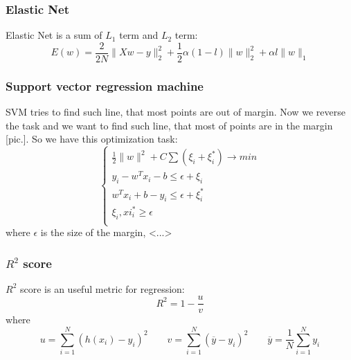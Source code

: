 \subsubsection*{Elastic Net}

Elastic Net is a sum of $L_1$ term and $L_2$ term:
$$E(w)=\frac{2}{2N}\|Xw-y\|_2^2+\frac{1}{2}\alpha(1-l)\|w\|_2^2+\alpha l\|w\|_1$$

\subsubsection*{Support vector regression machine}

SVM tries to find such line, that most points are out of margin. Now we reverse the task and we want to find such line, that most of points are in the margin [pic.]. So we have this optimization task:
$$\begin{cases}
	\frac{1}{2}\|w\|^2+C\sum(\xi_i+\xi_i^*)\to min \\
	y_i-w^Tx_i-b\le\epsilon+\xi_i \\
	w^Tx_i+b-y_i\le\epsilon+\xi_i^* \\
	\xi_i,xi_i^* \ge \epsilon \\
\end{cases}$$
where $\epsilon$ is the size of the margin, <...>

\subsubsection*{$R^2$ score}

$R^2$ score is an useful metric for regression:
$$R^2=1-\frac{u}{v}$$
where
$$u=\sum\limits_{i=1}^{N}(h(x_i)-y_i)^2\qquad v=\sum\limits_{i=1}^{N}(\overline{y}-y_i)^2\qquad \overline{y}=\frac{1}{N}\sum\limits_{i=1}^{N}y_i$$
